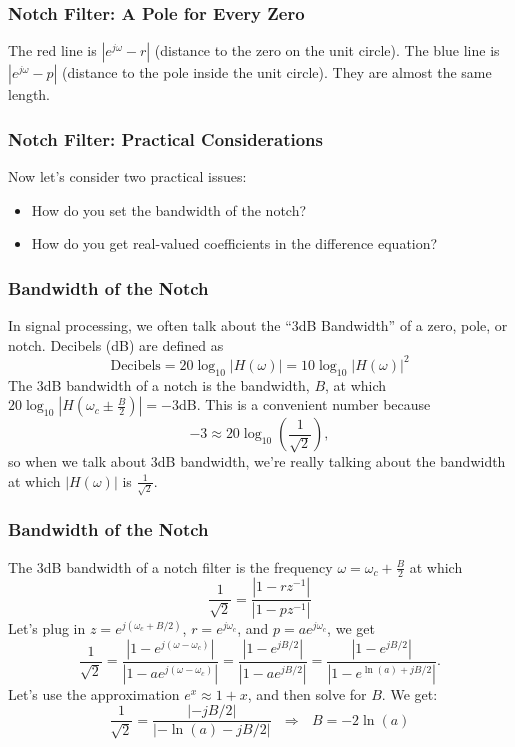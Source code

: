 \documentclass{beamer}
\begin{document}
\begin{frame}
  \frametitle{Notch Filter: A Pole for Every Zero} The red line is
  $|e^{j\omega}-r|$ (distance to the zero on the unit circle).  The
  blue line is $|e^{j\omega}-p|$ (distance to the pole inside the unit
  circle).  They are almost the same length.
  \centerline{}
\end{frame}

\begin{frame}
  \frametitle{Notch Filter: Practical Considerations}

  Now let's consider two practical issues:
  \begin{itemize}
  \item How do you set the bandwidth of the notch?
  \item How do you get real-valued coefficients in the difference equation?
  \end{itemize}
\end{frame}

\begin{frame}
  \frametitle{Bandwidth of the Notch}

  In signal processing, we often talk about the ``3dB Bandwidth'' of a
  zero, pole, or notch.  Decibels (dB)  are defined as
  \begin{displaymath}
    \mbox{Decibels} = 20\log_{10}|H(\omega)| = 10\log_{10}|H(\omega)|^2
  \end{displaymath}
  The 3dB bandwidth of a notch is the bandwidth, $B$, at which
  $20\log_{10}{|H\left(\omega_c\pm \frac{B}{2}\right)|}=-3$dB.
  This is a convenient number because
  \begin{displaymath}
    -3 \approx 20\log_{10}\left(\frac{1}{\sqrt{2}}\right),
  \end{displaymath}
  so when we talk about 3dB bandwidth, we're really talking about the
  bandwidth at which ${|H(\omega)|}$
  is $\frac{1}{\sqrt{2}}$.
\end{frame}

\begin{frame}
  \frametitle{Bandwidth of the Notch}

  The 3dB bandwidth of a notch filter is the frequency
  $\omega=\omega_c+\frac{B}{2}$ at which
  \begin{displaymath}
    \frac{1}{\sqrt{2}} = \frac{|1-rz^{-1}|}{|1-pz^{-1}|}
  \end{displaymath}
  Let's plug in $z=e^{j(\omega_c+B/2)}$, $r=e^{j\omega_c}$, and $p=ae^{j\omega_c}$, we get
  \begin{displaymath}
    \frac{1}{\sqrt{2}} = \frac{|1-e^{j(\omega-\omega_c)}|}{|1-ae^{j(\omega-\omega_c)}|}
    = \frac{|1-e^{jB/2}|}{|1-ae^{jB/2}|}
    = \frac{|1-e^{jB/2}|}{|1-e^{\ln(a)+jB/2}|}.
  \end{displaymath}
  Let's use the approximation $e^x\approx 1+x$, and then 
  solve for $B$.  We get:
  \begin{displaymath}
    \frac{1}{\sqrt{2}}=\frac{|-jB/2|}{|-\ln(a)-jB/2|}
    ~~~\Rightarrow~~~B = - 2\ln(a)
  \end{displaymath}
\end{frame}
\end{document}

